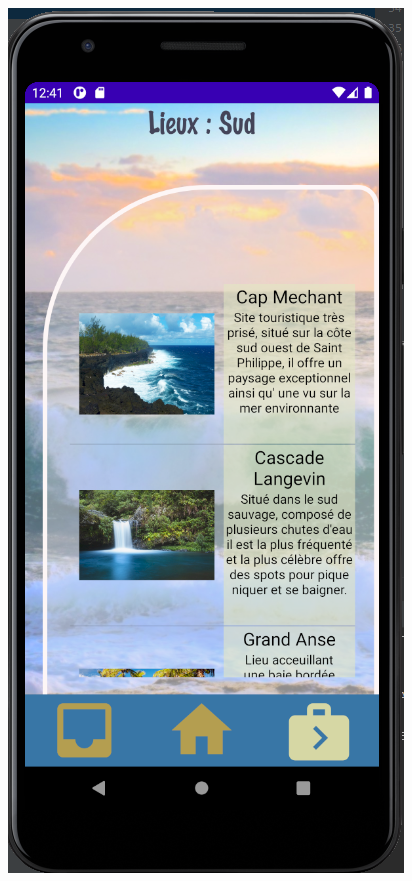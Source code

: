 \documentclass{article}
\begin{document}
\hfill
\begin{minipage}{0.23\textwidth}
\includegraphics[width=\textwidth]{Lieux_sud}
\end{minipage}
\end{document}
